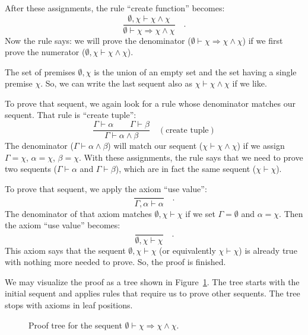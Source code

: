 After these assignments, the rule \textsf{``}create function\textsf{''} becomes:
\[
\frac{\emptyset,\chi\vdash\chi\wedge\chi}{\emptyset\vdash\chi\Rightarrow\chi\wedge\chi}\quad.
\]
Now the rule says: we will prove the denominator ($\emptyset\vdash\chi\Rightarrow\chi\wedge\chi$)
if we first prove the numerator ($\emptyset,\chi\vdash\chi\wedge\chi$).

The set of premises $\emptyset,\chi$ is the union of an empty set
and the set having a single premise $\chi$. So, we can write the
last sequent also as $\chi\vdash\chi\wedge\chi$ if we like.

To prove that sequent, we again look for a rule whose denominator
matches our sequent. That rule is \textsf{``}create tuple\textsf{''}:
\[
\frac{\Gamma\vdash\alpha\quad\quad\Gamma\vdash\beta}{\Gamma\vdash\alpha\wedge\beta}\quad(\text{create tuple})
\]
The denominator ($\Gamma\vdash\alpha\wedge\beta$) will match our
sequent ($\chi\vdash\chi\wedge\chi$) if we assign $\Gamma=\chi$,
$\alpha=\chi$, $\beta=\chi$. With these assignments, the rule says
that we need to prove two sequents ($\Gamma\vdash\alpha$ and $\Gamma\vdash\beta$),
which are in fact the same sequent ($\chi\vdash\chi$).

To prove that sequent, we apply the axiom \textsf{``}use value\textsf{''}:
\[
\frac{}{\Gamma,\alpha\vdash\alpha}\quad.
\]
The denominator of that axiom matches $\emptyset,\chi\vdash\chi$
if we set $\Gamma=\emptyset$ and $\alpha=\chi$. Then the axiom \textsf{``}use
value\textsf{''} becomes:
\[
\frac{}{\emptyset,\chi\vdash\chi}\quad.
\]
This axiom says that the sequent $\emptyset,\chi\vdash\chi$ (or equivalently
$\chi\vdash\chi$) is already true with nothing more needed to prove.
So, the proof is finished.

We may visualize the proof as a tree shown in Figure~\ref{fig:Proof-of-the-sequent-example-1}.
The tree starts with the initial sequent and applies rules that require
us to prove other sequents. The tree stops with axioms in leaf positions.

\begin{figure}
\begin{centering}
{\footnotesize{}}%
\par\end{centering}
\caption{Proof tree for the sequent $\emptyset\vdash\chi\Rightarrow\chi\wedge\chi$.\label{fig:Proof-of-the-sequent-example-1}}
\end{figure}

